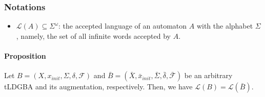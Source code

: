 
\subsubsection*{Notations}
\begin{itemize}
	\item $ \mathcal{L}(A) \subseteq \Sigma^\omega $: the accepted language of an automaton $ A $ with the alphabet $ \Sigma $, namely, the set of all infinite words accepted by $ A $.
\end{itemize}


\paragraph{Proposition}
Let $ B = (X,x_{init},\Sigma,\delta,\mathcal{F}) $ and $ \bar{B} = (\bar{X},\bar{x}_{init},\bar{\Sigma},\bar{\delta},\bar{\mathcal{F}}) $ be an arbitrary tLDGBA and its augmentation, respectively.
Then, we have $ \mathcal{L}(B) = \mathcal{L}(\bar{B}) $.

